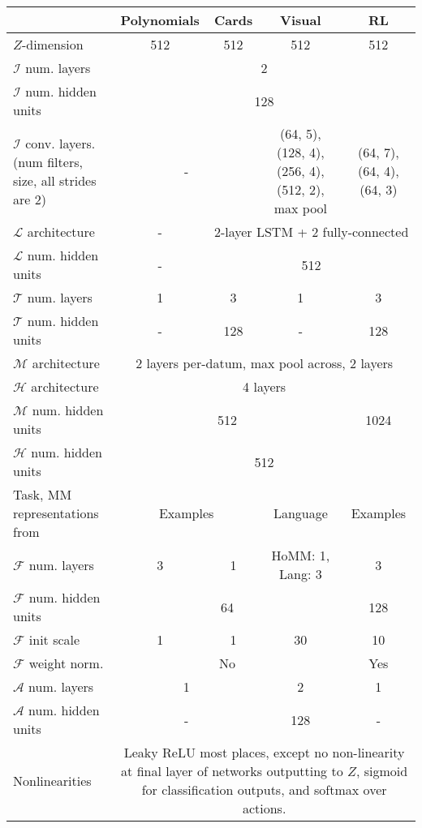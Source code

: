 \begin{table}
\scriptsize
\centering
\begin{tabular}{|p{3cm}||c|c|c|c|}
\hline
& Polynomials & Cards & Visual & RL \\\hline
\hline
$Z$-dimension & 512 & 512 & 512 & 512 \\\hline
$\mathcal{I}$ num. layers & \multicolumn{4}{c|}{2} \\\hline
$\mathcal{I}$ num. hidden units & \multicolumn{4}{c|}{128} \\\hline
$\mathcal{I}$ conv. layers. (num filters, size, all strides are 2) & \multicolumn{2}{c|}{-} & \multicolumn{1}{p{2.3cm}|}{(64, 5), (128, 4), (256, 4), (512, 2), max pool} & \multicolumn{1}{p{2.3cm}|}{(64, 7), (64, 4), (64, 3)}\\\hline
$\mathcal{L}$ architecture & -  & \multicolumn{3}{c|}{2-layer LSTM + 2 fully-connected} \\\hline
$\mathcal{L}$ num. hidden units & -  & \multicolumn{3}{c|}{512} \\\hline
$\mathcal{T}$ num. layers & 1 & 3 & 1 & 3 \\\hline
$\mathcal{T}$ num. hidden units & - & 128 & - & 128 \\\hline
$\mathcal{M}$ architecture & \multicolumn{4}{c|}{2 layers per-datum, max pool across, 2 layers} \\\hline
$\mathcal{H}$ architecture & \multicolumn{4}{c|}{4 layers} \\\hline
$\mathcal{M}$ num. hidden units & \multicolumn{3}{c|}{512} & 1024 \\\hline
$\mathcal{H}$ num. hidden units & \multicolumn{4}{c|}{512} \\\hline
Task, MM representations from & \multicolumn{2}{c|}{Examples} & Language & Examples \\\hline
$\mathcal{F}$ num. layers & 3 & 1 & HoMM: 1, Lang: 3 & 3 \\\hline
$\mathcal{F}$ num. hidden units & \multicolumn{3}{c|}{64} & 128 \\\hline
$\mathcal{F}$ init scale & 1 & 1 & 30 & 10 \\\hline
$\mathcal{F}$ weight norm. \citep{Salimans2016} & \multicolumn{3}{c|}{No} & Yes \\\hline
$\mathcal{A}$ num. layers & \multicolumn{2}{c|}{1} & 2 & 1 \\\hline
$\mathcal{A}$ num. hidden units & \multicolumn{2}{c|}{-} & 128 & -  \\\hline
Nonlinearities & \multicolumn{4}{p{11cm}|}{Leaky ReLU most places, except no non-linearity at final layer of networks outputting to $Z$, sigmoid for classification outputs, and softmax over actions.} \\\hline

\end{tabular}
\end{table}
